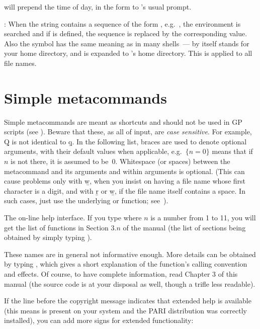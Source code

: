 
\noindent
will prepend the time of day, in the form 
to 's usual prompt.

\item {}: When the string contains a sequence of
the form , e.g.~, the environment is
searched and if  is defined, the sequence is replaced by the
corresponding value. Also the \kbd{\til} symbol has the same meaning as in
many shells~--- \kbd{\til} by itself stands for your home directory, and
 is expanded to 's home directory. This is applied
to all file names. \label{se:envir}

\section{Simple metacommands}\label{se:meta}

\noindent
Simple metacommands are meant as shortcuts and should not be used in GP
scripts (see ). Beware that these, as all of 
input, are \emph{case sensitive}. For example, \b{Q} is not identical to
\b{q}. In the following list, braces are used to denote optional arguments,
with their default values when applicable, e.g.~$\{n=0\}$ means that if $n$
is not there, it is assumed to be~$0$. Whitespace (or spaces) between the
metacommand and its arguments and within arguments is optional. (This can
cause problems only with \b{w}, when you insist on having a file name whose
first character is a digit, and with \b{r} or \b{w}, if the file name itself
contains a space. In such cases, just use the underlying  or
 function; see~).

 The  on-line help interface.
If you type  where $n$ is a number from 1 to 11, you will get the
list of functions in Section $3.n$ of the manual (the list of sections being
obtained by simply typing ). \label{se:exthelp}

These names are in general not informative enough. More details can be
obtained by typing , which gives a short explanation of
the function's calling convention and effects. Of course, to have complete
information, read Chapter 3 of this manual (the source code is at your
disposal as well, though a trifle less readable).

If the line before the copyright message indicates that extended help is
available (this means  is present on your system and the PARI
distribution was correctly installed), you can add more  signs for
extended functionality:

